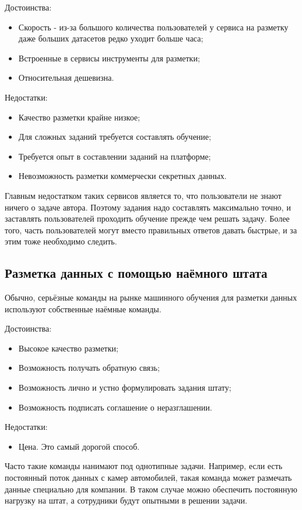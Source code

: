 Достоинства:
\begin{itemize}[wide]
    \item Скорость - из-за большого количества пользователей у сервиса на разметку даже больших датасетов редко уходит больше часа;
    \item Встроенные в сервисы инструменты для разметки;
    \item Относительная дешевизна.
\end{itemize}
Недостатки:
\begin{itemize}[wide]
    \item Качество разметки крайне низкое;
    \item Для сложных заданий требуется составлять обучение;
    \item Требуется опыт в составлении заданий на платформе;
    \item Невозможность разметки коммерчески секретных данных.
\end{itemize}
Главным недостатком таких сервисов является то, что пользователи не знают ничего о задаче автора. Поэтому задания надо составлять максимально точно, и заставлять пользователей проходить обучение прежде чем решать задачу. Более того, часть пользователей могут вместо правильных ответов давать быстрые, и за этим тоже необходимо следить.

\subsection{Разметка данных с помощью наёмного штата} \label{label_staff}
Обычно, серьёзные команды на рынке машинного обучения для разметки данных используют собственные наёмные команды.

Достоинства:
\begin{itemize}[wide]
    \item Высокое качество разметки;
    \item Возможность получать обратную связь;
    \item Возможность лично и устно формулировать задания штату;
    \item Возможность подписать соглашение о неразглашении.
\end{itemize}
Недостатки:
\begin{itemize}[wide]
    \item Цена. Это самый дорогой способ.
\end{itemize}
Часто такие команды нанимают под однотипные задачи. Например, если есть постоянный поток данных с камер автомобилей, такая команда может размечать данные специально для компании. В таком случае можно обеспечить постоянную нагрузку на штат, а сотрудники будут опытными в решении задачи.



